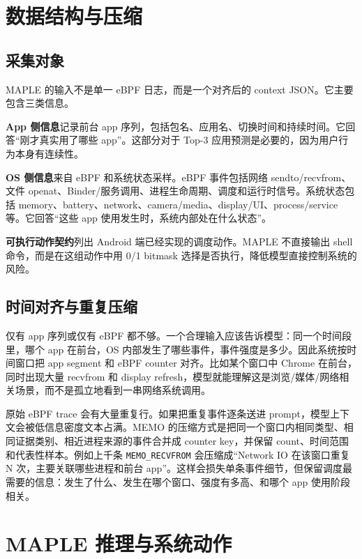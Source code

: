 \section{数据结构与压缩}

\subsection{采集对象}

MAPLE 的输入不是单一 eBPF 日志，而是一个对齐后的 context JSON。它主要包含三类信息。

\textbf{App 侧信息}记录前台 app 序列，包括包名、应用名、切换时间和持续时间。它回答“刚才真实用了哪些 app”。这部分对于 Top-3 应用预测是必要的，因为用户行为本身有连续性。

\textbf{OS 侧信息}来自 eBPF 和系统状态采样。eBPF 事件包括网络 sendto/recvfrom、文件 openat、Binder/服务调用、进程生命周期、调度和运行时信号。系统状态包括 memory、battery、network、camera/media、display/UI、process/service 等。它回答“这些 app 使用发生时，系统内部处在什么状态”。

\textbf{可执行动作契约}列出 Android 端已经实现的调度动作。MAPLE 不直接输出 shell 命令，而是在这组动作中用 0/1 bitmask 选择是否执行，降低模型直接控制系统的风险。

\subsection{时间对齐与重复压缩}

仅有 app 序列或仅有 eBPF 都不够。一个合理输入应该告诉模型：同一个时间段里，哪个 app 在前台，OS 内部发生了哪些事件，事件强度是多少。因此系统按时间窗口把 app segment 和 eBPF counter 对齐。比如某个窗口中 Chrome 在前台，同时出现大量 recvfrom 和 display refresh，模型就能理解这是浏览/媒体/网络相关场景，而不是孤立地看到一串网络系统调用。

原始 eBPF trace 会有大量重复行。如果把重复事件逐条送进 prompt，模型上下文会被低信息密度文本占满。MEMO 的压缩方式是把同一个窗口内相同类型、相同证据类别、相近进程来源的事件合并成 counter key，并保留 count、时间范围和代表性样本。例如上千条 \texttt{MEMO\_RECVFROM} 会压缩成“Network IO 在该窗口重复 N 次，主要关联哪些进程和前台 app”。这样会损失单条事件细节，但保留调度最需要的信息：发生了什么、发生在哪个窗口、强度有多高、和哪个 app 使用阶段相关。

\section{MAPLE 推理与系统动作}

